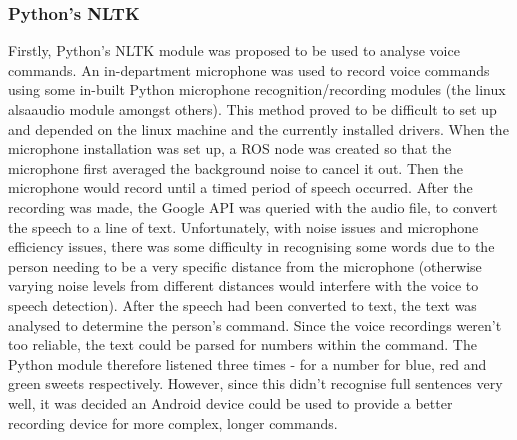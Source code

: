 \subsubsection{Python's NLTK}
Firstly, Python's NLTK module was proposed to be used to analyse voice commands. An in-department microphone was used to record voice commands using some in-built Python microphone recognition/recording modules (the linux alsaaudio module amongst others). This method proved to be difficult to set up and depended on the linux machine and the currently installed drivers. When the microphone installation was set up, a ROS node was created so that the microphone first averaged the background noise to cancel it out. Then the microphone would record until a timed period of speech occurred.
\newline\newline
After the recording was made, the Google API was queried with the audio file, to convert the speech to a line of text. Unfortunately, with noise issues and microphone efficiency issues, there was some difficulty in recognising some words due to the person needing to be a very specific distance from the microphone (otherwise varying noise levels from different distances would interfere with the voice to speech detection). After the speech had been converted to text, the text was analysed to determine the person's command. Since the voice recordings weren't too reliable, the text could be parsed for numbers within the command. The Python module therefore listened three times - for a number for blue, red and green sweets respectively. However, since this didn't recognise full sentences very well, it was decided an Android device could be used to provide a better recording device for more complex, longer commands.
